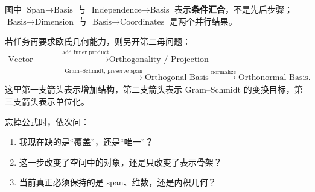 \documentclass[11pt,a4paper]{ctexart}
\newcommand{\kw}[1]{\textbf{\color{deep}#1}}
\begin{document}
图中 $\text{Span}\to\text{Basis}$ 与 $\text{Independence}\to\text{Basis}$ 表示\kw{条件汇合}，不是先后步骤；$\text{Basis}\to\text{Dimension}$ 与 $\text{Basis}\to\text{Coordinates}$ 是两个并行结果。

若任务再要求欧氏几何能力，则另开第二母问题：
\[
\begin{aligned}
\text{Vector Space}
&\xrightarrow{\text{add inner product}}
\text{Orthogonality / Projection}\\
&\xrightarrow{\text{Gram--Schmidt, preserve span}}
\text{Orthogonal Basis}
\xrightarrow{\text{normalize}}
\text{Orthonormal Basis}.
\end{aligned}
\]
这里第一支箭头表示增加结构，第二支箭头表示 Gram--Schmidt 的变换目标，第三支箭头表示单位化。

忘掉公式时，依次问：
\begin{enumerate}
  \item 我现在缺的是“覆盖”，还是“唯一”？
  \item 这一步改变了空间中的对象，还是只改变了表示骨架？
  \item 当前真正必须保持的是 span、维数，还是内积几何？
\end{enumerate}
\end{document}
